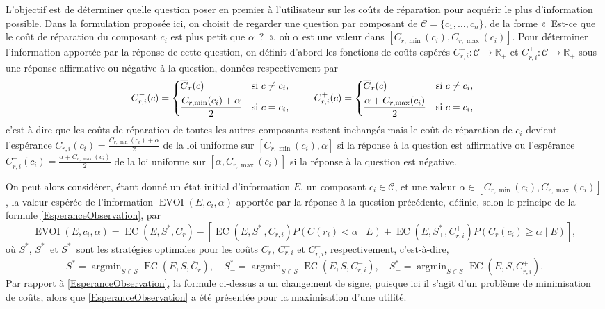 \documentclass[a4paper,11pt]{article}
\theoremstyle{plain}
\theoremstyle{definition}
\DeclareMathOperator*{\argmin}{argmin}
\DeclareMathOperator{\EC}{EC}
\DeclareMathOperator{\EVOI}{EVOI}
\begin{document}
L'objectif est de déterminer quelle question poser en premier à l'utilisateur sur les coûts de réparation pour acquérir le plus d'information possible. Dans la formulation proposée ici, on choisit de regarder une question par composant de $\mathcal C = \{c_1, \dotsc, c_n\}$, de la forme «~Est-ce que le coût de réparation du composant $c_i$ est plus petit que $\alpha$~?~», où $\alpha$ est une valeur dans $[C_{r, \min}(c_i), C_{r, \max}(c_i)]$. Pour déterminer l'information apportée par la réponse de cette question, on définit d'abord les fonctions de coûts espérés $C_{r, i}^-: \mathcal C \to \mathbb R_+$ et $C_{r, i}^+: \mathcal C \to \mathbb R_+$ sous une réponse affirmative ou négative à la question, données respectivement par
\begin{equation}
\label{EqDefiCpm}
C_{r, i}^-(c) = \begin{dcases*}
\overline C_r(c) & si $c \neq c_i$, \\
\frac{C_{r, \min}(c_i) + \alpha}{2} & si $c = c_i$,
\end{dcases*} \qquad C_{r, i}^+(c) = \begin{dcases*}
\overline C_r(c) & si $c \neq c_i$, \\
\frac{\alpha + C_{r, \max}(c_i)}{2} & si $c = c_i$,
\end{dcases*}
\end{equation}
c'est-à-dire que les coûts de réparation de toutes les autres composants restent inchangés mais le coût de réparation de $c_i$ devient l'espérance $C_{r, i}^-(c_i) = \frac{C_{r, \min}(c_i) + \alpha}{2}$ de la loi uniforme sur $[C_{r, \min}(c_i), \alpha]$ si la réponse à la question est affirmative ou l'espérance $C_{r, i}^+(c_i) = \frac{\alpha + C_{r, \max}(c_i)}{2}$ de la loi uniforme sur $[\alpha, C_{r, \max}(c_i)]$ si la réponse à la question est négative.

On peut alors considérer, étant donné un état initial d'information $E$, un composant $c_i \in \mathcal C$, et une valeur $\alpha \in [C_{r, \min}(c_i), C_{r, \max}(c_i)]$, la valeur espérée de l'information $\EVOI(E, c_i, \alpha)$ apportée par la réponse à la question précédente, définie, selon le principe de la formule \eqref{EsperanceObservation}, par
\begin{equation}
\label{EqDefiEVOI}
\EVOI(E, c_i, \alpha) = \EC(E, S^\ast, \overline C_r) - \left[\EC(E, S_-^\ast, C_{r, i}^-) P(C(r_i) < \alpha \mid E) + \EC(E, S_+^\ast, C_{r, i}^+) P(C_r(c_i) \geq \alpha \mid E)\right],
\end{equation}
où $S^\ast$, $S_-^\ast$ et $S_+^\ast$ sont les stratégies optimales pour les coûts $\overline C_r$, $C_{r, i}^-$ et $C_{r, i}^+$, respectivement, c'est-à-dire,
\begin{equation}
\label{EqSAsts}
S^\ast = \argmin_{S \in \mathcal S} \EC(E, S, \overline C_r), \quad S_-^\ast = \argmin_{S \in \mathcal S} \EC(E, S, C_{r, i}^-), \quad S_+^\ast = \argmin_{S \in \mathcal S} \EC(E, S, C_{r, i}^+).
\end{equation}
Par rapport à \eqref{EsperanceObservation}, la formule ci-dessus a un changement de signe, puisque ici il s'agit d'un problème de minimisation de coûts, alors que \eqref{EsperanceObservation} a été présentée pour la maximisation d'une utilité.
\end{document}
